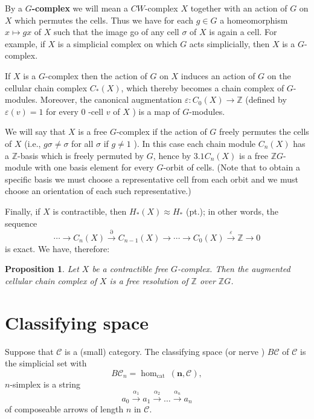 \documentclass{book}
\newtheorem{prop}{Proposition}
\begin{document}
By a \textbf{$G$-complex} we will mean a $C W$-complex $X$ together with an action of $G$ on $X$ which permutes the cells. Thus we have for each $g \in G$ a homeomorphism $x \mapsto g x$ of $X$ such that the image go of any cell $\sigma$ of $X$ is again a cell. For example, if $X$ is a simplicial complex on which $G$ acts simplicially, then $X$ is a $G$-complex.

If $X$ is a $G$-complex then the action of $G$ on $X$ induces an action of $G$ on the cellular chain complex $C_*(X)$, which thereby becomes a chain complex of $G$-modules. Moreover, the canonical augmentation $\varepsilon: C_0(X) \rightarrow \mathbb{Z}$ (defined by $\varepsilon(v)=1$ for every 0 -cell $v$ of $X$ ) is a map of $G$-modules.

We will say that $X$ is a free $G$-complex if the action of $G$ freely permutes the cells of $X$ (i.e., $g \sigma \neq \sigma$ for all $\sigma$ if $g \neq 1$ ). In this case each chain module $C_n(X)$ has a $\mathbb{Z}$-basis which is freely permuted by $G$, hence by $3.1 C_n(X)$ is a free $\mathbb{Z} G$-module with one basis element for every $G$-orbit of cells. (Note that to obtain a specific basis we must choose a representative cell from each orbit and we must choose an orientation of each such representative.)

Finally, if $X$ is contractible, then $H_*(X) \approx H_*$ (pt.); in other words, the sequence
$$
\cdots \rightarrow C_n(X) \stackrel{\partial}{\rightarrow} C_{n-1}(X) \rightarrow \cdots \rightarrow C_0(X) \stackrel{\varepsilon}{\rightarrow} \mathbb{Z} \rightarrow 0
$$
is exact. We have, therefore:

\begin{prop}
    
    Let $X$ be a contractible free $G$-complex. Then the augmented cellular chain complex of $X$ is a free resolution of $\mathbb{Z}$ over $\mathbb{Z} G$.
\end{prop}




\section{Classifying space}

Suppose that $\mathcal{C}$ is a (small) category. The classifying space (or nerve ) $B \mathcal{C}$ of $\mathcal{C}$ is the simplicial set with
$$
B \mathcal{C}_n=\operatorname{hom}_{\text {cat }}(\mathbf{n}, \mathcal{C}),
$$
$n$-simplex is a string
$$
a_0 \xrightarrow{\alpha_1} a_1 \xrightarrow{\alpha_2} \ldots \xrightarrow{\alpha_n} a_n
$$
of composeable arrows of length $n$ in $\mathcal{C}$.\\
\end{document}
